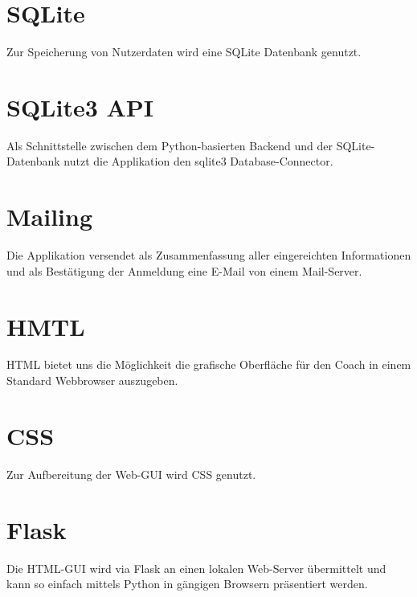     \section{SQLite}
        Zur Speicherung von Nutzerdaten wird eine SQLite Datenbank \cite{sqlite} genutzt.


    \section{SQLite3 API}
        Als Schnittstelle zwischen dem Python-basierten Backend und der SQLite-Datenbank nutzt die Applikation den sqlite3 Database-Connector. \cite{sqlite3API}


    \section{Mailing}
        Die Applikation versendet als Zusammenfassung aller eingereichten Informationen und als Bestätigung der Anmeldung eine E-Mail von einem Mail-Server. 


    \section{HMTL}
        HTML bietet uns die Möglichkeit die grafische Oberfläche für den Coach in einem Standard Webbrowser auszugeben. \cite{HTML}


    \section{CSS}
        Zur Aufbereitung der Web-GUI wird CSS genutzt.


    \section{Flask}
        Die HTML-GUI wird via Flask \cite{flask} an einen lokalen Web-Server übermittelt und kann so einfach mittels Python in gängigen Browsern präsentiert werden.


